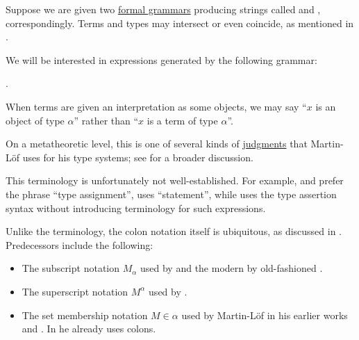 \begin{definition}\label{def:type_assertion}\mimprovised
  Suppose we are given two \hyperref[def:formal_grammar/schema]{formal grammars} producing strings called  and , correspondingly. Terms and types may intersect or even coincide, as mentioned in .

  We will be interested in expressions generated by the following grammar:
  \begin{bnf*}
     { \bnfsp \bnftsq{\( : \)} \bnfsp {}}.
  \end{bnf*}
\end{definition}
\begin{comments}
  \item When terms are given an interpretation as some objects, we may say \enquote{\( x \) is an object of type \( \alpha \)} rather than \enquote{\( x \) is a term of type \( \alpha \)}.

  \item On a metatheoretic level, this is one of several kinds of \hyperref[con:judgment]{judgments} that Martin-L\"of uses for his type systems; see  for a broader discussion.

  \item This terminology is unfortunately not well-established. For example,  and  prefer the phrase \enquote{type assignment},  uses \enquote{statement}, while  uses the type assertion syntax without introducing terminology for such expressions.

  \item Unlike the terminology, the colon notation itself is ubiquitous, as discussed in \cite{MathSE:origin_of_colon_notation_for_type_assertions}. Predecessors include the following:
  \begin{itemize}
    \item The subscript notation \( M_\alpha \) used by \cite{Church1940STT} and the modern by old-fashioned \cite{Andrews2002STT}.
    \item The superscript notation \( M^\alpha \) used by \cite{Howard1980FormulasAsTypes}.
    \item The set membership notation \( M \in \alpha \) used by Martin-L\"of in his earlier works \cite{MartinLöf1975IntTypeTheory} and \cite{MartinLöf1984IntTypeTheory}. In \cite{MartinLöf1994TypeJudgments} he already uses colons.
  \end{itemize}
\end{comments}

